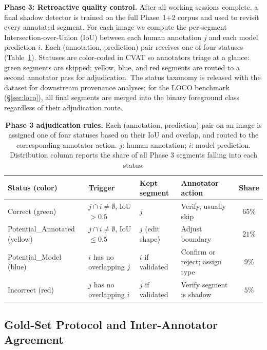 \textbf{Phase 3: Retroactive quality control.} After all working
sessions complete, a final shadow detector is trained on the full
Phase~1$+$2 corpus and used to revisit every annotated segment. For
each image we compute the per-segment Intersection-over-Union (IoU)
between each human annotation $j$ and each model prediction $i$. Each
(annotation, prediction) pair receives one of four statuses
(Table~\ref{tab:adjudication}). Statuses are color-coded in CVAT so
annotators triage at a glance: green segments are skipped; yellow,
blue, and red segments are routed to a second annotator pass for
adjudication. The status taxonomy is released with the dataset for
downstream provenance analyses; for the LOCO benchmark
(\S\ref{sec:loco}), all final segments are merged into the binary
foreground class regardless of their adjudication route.

\begin{table}[h]
  \centering
  \small
  \setlength{\tabcolsep}{4pt}
  \caption{
    \textbf{Phase 3 adjudication rules.}
    Each (annotation, prediction) pair on an image is assigned one of
    four statuses based on their IoU and overlap, and routed to the
    corresponding annotator action.
    $j$: human annotation; $i$: model prediction.
    Distribution column reports the share of all Phase 3 segments
    falling into each status.
  }
  \label{tab:adjudication}
  \begin{tabular}{@{}lp{3.1cm}p{2cm}p{3.4cm}c@{}}
    \toprule
    \textbf{Status (color)} & \textbf{Trigger} & \textbf{Kept segment} & \textbf{Annotator action} & \textbf{Share} \\
    \midrule
    Correct (green) &
      $j \cap i \neq \emptyset$, IoU\,$>0.5$ &
      $j$ &
      Verify, usually skip &
      $65\%$ \\
    Potential\_Annotated (yellow) &
      $j \cap i \neq \emptyset$, IoU\,$\leq 0.5$ &
      $j$ (edit shape) &
      Adjust boundary &
      $21\%$ \\
    Potential\_Model (blue) &
      $i$ has no overlapping $j$ &
      $i$ if validated &
      Confirm or reject; assign type &
      $9\%$ \\
    Incorrect (red) &
      $j$ has no overlapping $i$ &
      $j$ if validated &
      Verify segment is shadow &
      $5\%$ \\
    \bottomrule
  \end{tabular}
\end{table}

\subsection{Gold-Set Protocol and Inter-Annotator Agreement}
\label{app:gold}

